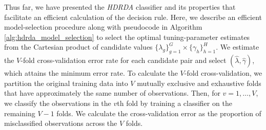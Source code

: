 \documentclass[]{interact}\usepackage[]{graphicx}\usepackage[]{color}
\begin{document}
Thus far, we have presented the \emph{HDRDA} classifier and its properties that
facilitate an efficient calculation of the decision rule. Here, we describe an
efficient model-selection procedure along with pseudocode in Algorithm
\ref{alg:hdrda_model_selection} to select the optimal tuning-parameter estimates
from the Cartesian product of candidate values $\{\lambda_g\}_{g=1}^G \times
\{\gamma_h\}_{h=1}^H$. We estimate the $V$-fold cross-validation error rate for
each candidate pair and select $(\widehat{\lambda}, \widehat{\gamma})$, which
attains the minimum error rate. To calculate the $V$-fold cross-validation, we
partition the original training data into $V$ mutually exclusive and exhaustive
folds that have approximately the same number of observations. Then, for $v = 1,
\ldots, V$, we classify the observations in the $v$th fold by training a
classifier on the remaining $V - 1$ folds. We calculate the cross-validation
error as the proportion of misclassified observations across the $V$ folds.
\end{document}
